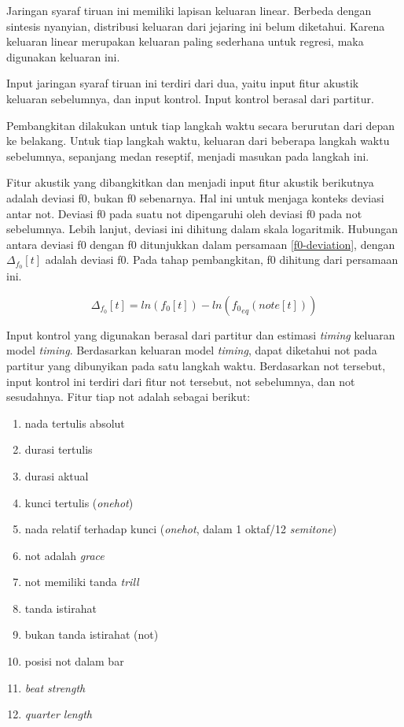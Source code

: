 Jaringan syaraf tiruan ini memiliki lapisan keluaran linear. Berbeda dengan sintesis nyanyian, distribusi keluaran dari jejaring ini belum diketahui. Karena keluaran linear merupakan keluaran paling sederhana untuk regresi, maka digunakan keluaran ini.

Input jaringan syaraf tiruan ini terdiri dari dua, yaitu input fitur akustik keluaran sebelumnya, dan input kontrol. Input kontrol berasal dari partitur.

Pembangkitan dilakukan untuk tiap langkah waktu secara berurutan dari depan ke belakang. Untuk tiap langkah waktu, keluaran dari beberapa langkah waktu sebelumnya, sepanjang medan reseptif, menjadi masukan pada langkah ini.

Fitur akustik yang dibangkitkan dan menjadi input fitur akustik berikutnya adalah deviasi f0, bukan f0 sebenarnya. Hal ini untuk menjaga konteks deviasi antar not. Deviasi f0 pada suatu not dipengaruhi oleh deviasi f0 pada not sebelumnya. Lebih lanjut, deviasi ini dihitung dalam skala logaritmik. Hubungan antara deviasi f0 dengan f0 ditunjukkan dalam persamaan \ref{f0-deviation}, dengan $\Delta_{f_0}[t]$ adalah deviasi f0. Pada tahap pembangkitan, f0 dihitung dari persamaan ini.

\begin{equation}
    \Delta_{f_0}[t] = ln(f_0[t]) - ln({f_0}_{eq}(note[t]))
\end{equation}\label{f0-deviation}

Input kontrol yang digunakan berasal dari partitur dan estimasi \textit{timing} keluaran model \textit{timing}. Berdasarkan keluaran model \textit{timing}, dapat diketahui not pada partitur yang dibunyikan pada satu langkah waktu. Berdasarkan not tersebut, input kontrol ini terdiri dari fitur not tersebut, not sebelumnya, dan not sesudahnya. Fitur tiap not adalah sebagai berikut:

\begin{enumerate}
  \item nada tertulis absolut 
  \item durasi tertulis
  \item durasi aktual
  \item kunci tertulis (\textit{onehot})
  \item nada relatif terhadap kunci (\textit{onehot}, dalam 1 oktaf/12 \textit{semitone})
  \item not adalah \textit{grace}
  \item not memiliki tanda \textit{trill}
  \item tanda istirahat
  \item bukan tanda istirahat (not)
  \item posisi not dalam bar
  \item \textit{beat strength}
  \item \textit{quarter length}
\end{enumerate}

